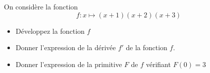 \bexo
On considère la fonction
\begin{equation}
	f:x\mapsto (x+1)(x+2)(x+3)
\end{equation}
\begin{itemize}
	\item Développez la fonction $f$
	\item Donner l'expression de la dérivée $f'$ de la fonction $f$.
	\item Donner l'expression de la primitive $F$ de $f$ vérifiant $F(0)=3$
\end{itemize}
	\ifsolutions \else 
\vspace*{10cm}
\fi 
\eexo
{}


